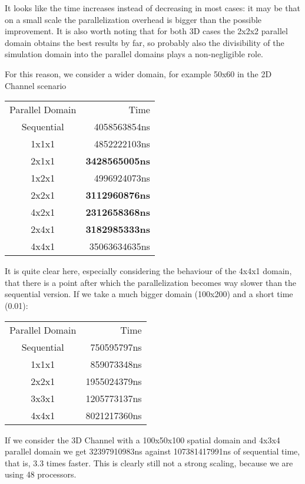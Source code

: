 \documentclass[
  english,        %
  font=palatino,     %
  onecolumn,      %
]{tumarticle}
\begin{document}
It looks like the time increases instead of decreasing in most cases: it may be that on a small scale the parallelization overhead is bigger than the possible improvement. It is also worth noting that for both 3D cases the 2x2x2 parallel domain obtains the best results by far, so probably also the divisibility of the simulation domain into the parallel domains plays a non-negligible role.

For this reason, we consider a wider domain, for example 50x60 in the 2D Channel scenario

\begin{tabular}{c r}
  Parallel Domain & Time                  \\
  Sequential      & 4058563854ns          \\
  1x1x1           & 4852222103ns          \\
  2x1x1           & \textbf{3428565005ns} \\
  1x2x1           & 4996924073ns          \\
  2x2x1           & \textbf{3112960876ns} \\
  4x2x1           & \textbf{2312658368ns} \\
  2x4x1           & \textbf{3182985333ns} \\
  4x4x1           & 35063634635ns         \\
\end{tabular}

It is quite clear here, especially considering the behaviour of the 4x4x1 domain, that there is a point after which the parallelization becomes way slower than the sequential version. If we take a much bigger domain (100x200) and a short time (0.01):


\begin{tabular}{c r}
  Parallel Domain & Time         \\
  Sequential      & 750595797ns  \\
  1x1x1           & 859073348ns  \\
  2x2x1           & 1955024379ns \\
  3x3x1           & 1205773137ns \\
  4x4x1           & 8021217360ns \\
\end{tabular}

If we consider the 3D Channel with a 100x50x100 spatial domain and 4x3x4 parallel domain we get 32397910983ns against 107381417991ns of sequential time, that is, 3.3 times faster. This is clearly still not a strong scaling, because we are using 48 processors.
\\
\end{document}
